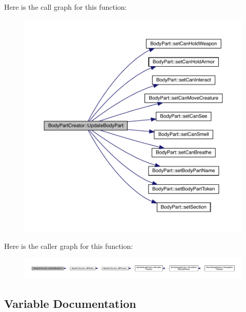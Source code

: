 Here is the call graph for this function\+:
\nopagebreak
\begin{figure}[H]
\begin{center}
\leavevmode
\includegraphics[width=350pt]{d8/d3a/namespace_body_part_creator_ab6d6a7845f43f745c09aaa1514881e20_cgraph}
\end{center}
\end{figure}
Here is the caller graph for this function\+:
\nopagebreak
\begin{figure}[H]
\begin{center}
\leavevmode
\includegraphics[width=350pt]{d8/d3a/namespace_body_part_creator_ab6d6a7845f43f745c09aaa1514881e20_icgraph}
\end{center}
\end{figure}


\subsection{Variable Documentation}
\mbox{\label{namespace_body_part_creator_a347906131734cc9049f71d6f8869e15b}} 
